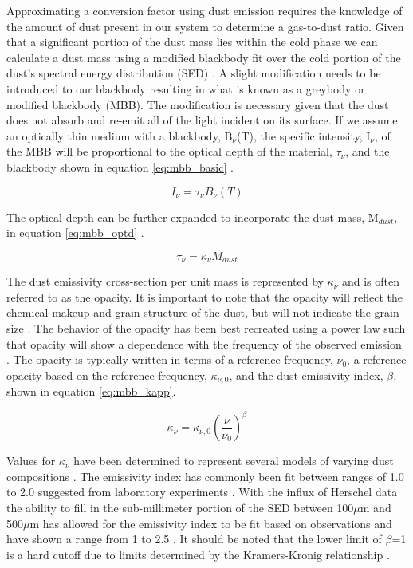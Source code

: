 Approximating a conversion factor using dust emission requires the knowledge of the amount of dust present in our system to determine a gas-to-dust ratio.  Given that a significant portion of the dust mass lies within the cold phase we can calculate a dust mass using a modified blackbody fit over the cold portion of the dust's spectral energy distribution (SED) \citep{galametz2012}.  A slight modification needs to be introduced to our blackbody resulting in what is known as a greybody or modified blackbody (MBB).  The modification is necessary given that the dust does not absorb and re-emit all of the light incident on its surface.  If we assume an optically thin medium with a blackbody, B$_\nu$(T), the specific intensity, I$_\nu$, of the MBB will be proportional to the optical depth of the material, $\tau_\nu$, and the blackbody shown in equation \ref{eq:mbb_basic} \citep{planckXI2013}.

\begin{equation}\label{eq:mbb_basic}
  I_\nu = \tau_\nu B_\nu\left(T\right)
\end{equation}

The optical depth can be further expanded to incorporate the dust mass, M$_{dust}$, in equation \ref{eq:mbb_optd} \citep{planckXI2013}.

\begin{equation}\label{eq:mbb_optd}
  \tau_\nu = \kappa_\nu M_{dust}
\end{equation}

The dust emissivity cross-section per unit mass is represented by $\kappa_\nu$ and is often referred to as the opacity.  It is important to note that the opacity will reflect the chemical makeup and grain structure of the dust, but will not indicate the grain size \citep{planckXI2013}.  The behavior of the opacity has been best recreated using a power law such that opacity will show a dependence with the frequency of the observed emission \citep{hildebrand1983}.  The opacity is typically written in terms of a reference frequency, $\nu_0$, a reference opacity based on the reference frequency, $\kappa_{\nu,0}$, and the dust emissivity index, $\beta$, shown in equation \ref{eq:mbb_kapp}.

\begin{equation}\label{eq:mbb_kapp}
  \kappa_\nu = \kappa_{\nu,0}\left(\frac{\nu}{\nu_0}\right)^\beta \end{equation}

Values for $\kappa_\nu$ have been determined to represent several models of varying dust compositions \citep{li2001,planckxxv2011}.  The emissivity index has commonly been fit between ranges of 1.0 to 2.0  suggested from laboratory experiments \citep{walcher2011}.  With the influx of Herschel data the ability to fill in the sub-millimeter portion of the SED between 100$\mu$m and 500$\mu$m has allowed for the emissivity index to be fit based on observations and have shown a range from 1 to 2.5 \citep{galametz2012}.  It should be noted that the lower limit of $\beta$=1 is a hard cutoff due to limits determined by the Kramers-Kronig relationship \citep{li2005}.

